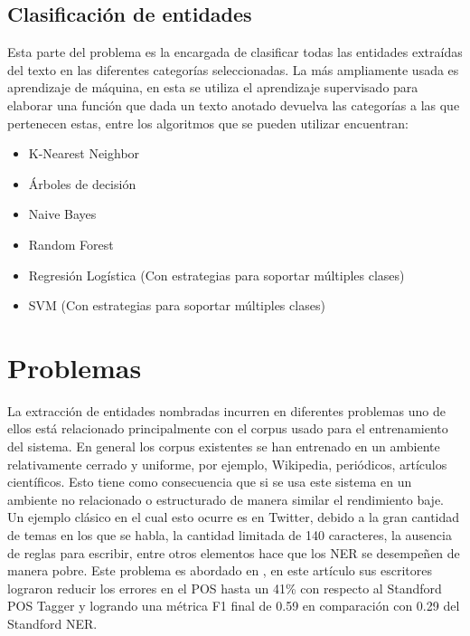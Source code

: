 \documentclass[runningheads]{llncs}
\begin{document}
\subsection{Clasificación de entidades}

Esta parte del problema es la encargada de clasificar todas las entidades extraídas del texto en las diferentes categorías seleccionadas. La más ampliamente usada es aprendizaje de máquina, en esta se utiliza el aprendizaje supervisado para elaborar una función que dada un texto anotado devuelva las categorías a las que pertenecen estas, entre los algoritmos que se pueden utilizar encuentran:

\begin{itemize}

\item K-Nearest Neighbor
\item Árboles de decisión
\item Naive Bayes
\item Random Forest
\item Regresión Logística (Con estrategias para soportar múltiples clases)
\item SVM (Con estrategias para soportar múltiples clases)

\end{itemize}


\section{Problemas}

La extracción de entidades nombradas incurren en diferentes problemas uno de ellos está relacionado principalmente con el corpus usado para el entrenamiento del sistema. En general los corpus existentes se han entrenado en un ambiente relativamente cerrado y uniforme, por ejemplo, Wikipedia, periódicos, artículos científicos. Esto tiene como consecuencia que si se usa este sistema en un ambiente no relacionado o estructurado de manera similar el rendimiento baje. Un ejemplo clásico en el cual esto ocurre es en Twitter, debido a la gran cantidad de temas en los que se habla, la cantidad limitada de 140 caracteres, la ausencia de reglas para escribir,  entre otros elementos hace que los NER se desempeñen de manera pobre. Este problema es abordado en \cite{tweeter}, en este artículo sus escritores lograron reducir los errores en el POS hasta un 41\% con respecto al Standford POS Tagger y logrando una métrica F1 final de 0.59 en comparación con 0.29 del Standford NER.
\end{document}

